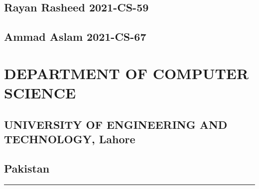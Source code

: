 \documentclass[12pt]{article}
\newcommand{\Rule}{\rule{\linewidth}{0.5pt}}
\begin{document}
\begin{center}
\begin{center}
	        \subsection*{Rayan Rasheed      2021-CS-59}
	        \subsection*{Ammad Aslam        2021-CS-67} \hfill
	     \hfill \break 
      \end{center}
	    \section*{DEPARTMENT OF COMPUTER SCIENCE}
	    \subsection*{UNIVERSITY OF ENGINEERING AND TECHNOLOGY, Lahore}
	    \subsection*{Pakistan}
     
	    \newpage
	\end{center}


	\Rule
\tableofcontents
\end{document}
